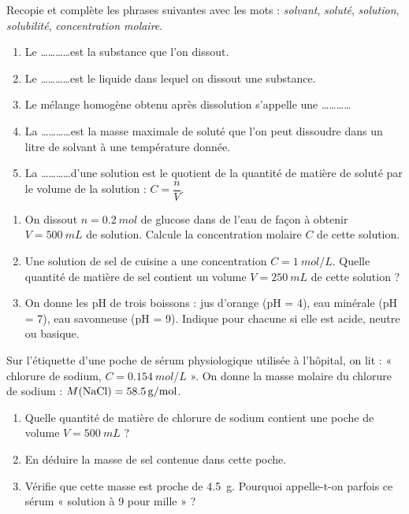 \documentclass[11pt]{article}
\newcounter{popsec}
\newcounter{popsub}
\newcommand{\courssub}[1]{%
  \stepcounter{popsub}%
  \par\vspace{9pt}\noindent{\popxbold\fontsize{11.5}{13}\selectfont\color{popink}{\color{poporange}\thepopsec.\thepopsub}\hspace{6pt}#1}\par\nopagebreak\vspace{4pt}
}
\begin{document}
\begin{exercice}
Recopie et complète les phrases suivantes avec les mots : \emph{solvant}, \emph{soluté}, \emph{solution}, \emph{solubilité}, \emph{concentration molaire}.

\begin{enumerate}
\item Le \ldots\ldots\ldots\ldots est la substance que l'on dissout.
\item Le \ldots\ldots\ldots\ldots est le liquide dans lequel on dissout une substance.
\item Le mélange homogène obtenu après dissolution s'appelle une \ldots\ldots\ldots\ldots
\item La \ldots\ldots\ldots\ldots est la masse maximale de soluté que l'on peut dissoudre dans un litre de solvant à une température donnée.
\item La \ldots\ldots\ldots\ldots d'une solution est le quotient de la quantité de matière de soluté par le volume de la solution : $C = \dfrac{n}{V}$.
\end{enumerate}
\end{exercice}

\begin{exercice}
\begin{enumerate}
\item On dissout $n = \SI{0,2}{mol}$ de glucose dans de l'eau de façon à obtenir $V = \SI{500}{mL}$ de solution. Calcule la concentration molaire $C$ de cette solution.
\item Une solution de sel de cuisine a une concentration $C = \SI{1}{mol/L}$. Quelle quantité de matière de sel contient un volume $V = \SI{250}{mL}$ de cette solution ?
\item On donne les pH de trois boissons : jus d'orange (pH = 4), eau minérale (pH = 7), eau savonneuse (pH = 9). Indique pour chacune si elle est acide, neutre ou basique.
\end{enumerate}
\end{exercice}

\courssub{Je m'entraîne}

\begin{exercice}
Sur l'étiquette d'une poche de sérum physiologique utilisée à l'hôpital, on lit : « chlorure de sodium, $C = \SI{0,154}{mol/L}$ ». On donne la masse molaire du chlorure de sodium : $M(\ce{NaCl}) = \SI{58,5}{g/mol}$.

\begin{enumerate}
\item Quelle quantité de matière de chlorure de sodium contient une poche de volume $V = \SI{500}{mL}$ ?
\item En déduire la masse de sel contenue dans cette poche.
\item Vérifie que cette masse est proche de \SI{4,5}{g}. Pourquoi appelle-t-on parfois ce sérum « solution à 9 pour mille » ?
\end{enumerate}
\end{exercice}
\end{document}
